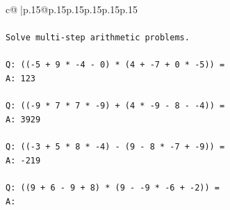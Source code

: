 \documentclass{article}
\begin{document}
{\begin{supertabular}{c@{$\;$}|p{.15\linewidth}@{}p{.15\linewidth}p{.15\linewidth}p{.15\linewidth}p{.15\linewidth}p{.15\linewidth}}
{{{\\ 
\\ 
\texttt{Solve multi{-}step arithmetic problems.} \\
\\ 
\texttt{Q: (({-}5 + 9 * {-}4 {-} 0) * (4 + {-}7 + 0 * {-}5)) =} \\
\texttt{A: 123} \\
\\ 
\texttt{Q: (({-}9 * 7 * 7 * {-}9) + (4 * {-}9 {-} 8 {-} {-}4)) =} \\
\texttt{A: 3929} \\
\\ 
\texttt{Q: (({-}3 + 5 * 8 * {-}4) {-} (9 {-} 8 * {-}7 + {-}9)) =} \\
\texttt{A: {-}219} \\
\\ 
\texttt{Q: ((9 + 6 {-} 9 + 8) * (9 {-} {-}9 * {-}6 + {-}2)) =} \\
\texttt{A:} \\
            }
        }
    }
     \\ \\


\end{supertabular}}
\end{document}

